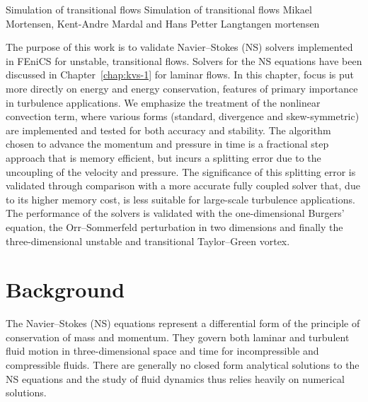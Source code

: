 \renewcommand{\vec}[1]{\ensuremath{{#1}}}
\newcommand{\Nset}{\ensuremath{\mathbb{N}}\xspace}
\newcommand{\Zset}{\ensuremath{\mathbb{Z}}\xspace}
\newcommand{\Qset}{\ensuremath{\mathbb{Q}}\xspace}
\newcommand{\Cset}{\ensuremath{\mathbb{C}}\xspace}
\newcommand{\Hdivnull}{\ensuremath{Z}}

              {Simulation of transitional flows}
              {Simulation of transitional flows}
              {Mikael Mortensen, Kent-Andre Mardal and Hans Petter Langtangen}
              {mortensen}


The purpose of this work is to validate Navier--Stokes (NS) solvers
implemented in FEniCS for unstable, transitional flows. Solvers for
the NS equations have been discussed in Chapter~\ref{chap:kvs-1} for
laminar flows. In this chapter, focus is put more directly on energy
and energy conservation, features of primary importance in turbulence
applications. We emphasize the treatment of the nonlinear convection
term, where various forms (standard, divergence and skew-symmetric) are
implemented and tested for both accuracy and stability. The algorithm
chosen to advance the momentum and pressure in time is a fractional
step approach that is memory efficient, but incurs a splitting error
due to the uncoupling of the velocity and pressure. The significance
of this splitting error is validated through comparison with a more
accurate fully coupled solver that, due to its higher memory cost, is
less suitable for large-scale turbulence applications. The performance
of the solvers is validated with the one-dimensional Burgers' equation,
the Orr--Sommerfeld perturbation in two dimensions and finally the
three-dimensional unstable and transitional Taylor--Green vortex.

\section{Background}

The Navier--Stokes (NS) equations represent a differential form of the
principle of conservation of mass and momentum. They govern both laminar
and turbulent fluid motion in three-dimensional space and time for
incompressible and compressible fluids. There are generally no closed
form analytical solutions to the NS equations and the study of fluid
dynamics thus relies heavily on numerical solutions.

